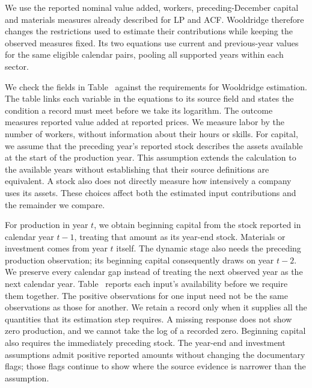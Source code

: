 We use the reported nominal value added, workers, preceding-December capital and materials measures already described for LP and ACF. Wooldridge therefore changes the restrictions used to estimate their contributions while keeping the observed measures fixed. Its two equations use current and previous-year values for the same eligible calendar pairs, pooling all supported years within each sector.

We check the fields in Table~ against the requirements for Wooldridge estimation. The table links each variable in the equations to its source field and states the condition a record must meet before we take its logarithm.
The outcome measures reported value added at reported prices. We measure labor by the number of workers, without information about their hours or skills. For capital, we assume that the preceding year's reported stock describes the assets available at the start of the production year. This assumption extends the calculation to the available years without establishing that their source definitions are equivalent. A stock also does not directly measure how intensively a company uses its assets. These choices affect both the estimated input contributions and the remainder we compare.

For production in year $t$, we obtain beginning capital from the stock reported in calendar year $t-1$, treating that amount as its year-end stock. Materials or investment comes from year $t$ itself. The dynamic stage also needs the preceding production observation; its beginning capital consequently draws on year $t-2$. We preserve every calendar gap instead of treating the next observed year as the next calendar year. Table~ reports each input's availability before we require them together.
The positive observations for one input need not be the same observations as those for another. We retain a record only when it supplies all the quantities that its estimation step requires. A missing response does not show zero production, and we cannot take the log of a recorded zero. Beginning capital also requires the immediately preceding stock. The year-end and investment assumptions admit positive reported amounts without changing the documentary flags; those flags continue to show where the source evidence is narrower than the assumption.

